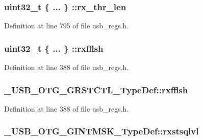 \hypertarget{group___u_s_b___o_t_g___d_r_i_v_e_r_ga14fede4b39b5376cdf45cb097817fbba}{
\subsubsection[{rx\-\_\-thr\-\_\-len}]{\setlength{\rightskip}{0pt plus 5cm}uint32\-\_\-t \{ ... \} \-::rx\-\_\-thr\-\_\-len}}\label{group___u_s_b___o_t_g___d_r_i_v_e_r_ga14fede4b39b5376cdf45cb097817fbba}


Definition at line 795 of file usb\-\_\-regs.\-h.

\hypertarget{group___u_s_b___o_t_g___d_r_i_v_e_r_gac3bc22e3eeec98ccefb2f7fe4a1c7e0c}{
\subsubsection[{rxfflsh}]{\setlength{\rightskip}{0pt plus 5cm}uint32\-\_\-t \{ ... \} \-::rxfflsh}}\label{group___u_s_b___o_t_g___d_r_i_v_e_r_gac3bc22e3eeec98ccefb2f7fe4a1c7e0c}


Definition at line 388 of file usb\-\_\-regs.\-h.

\hypertarget{group___u_s_b___o_t_g___d_r_i_v_e_r_ga1cc327f836fad208772495510703d944}{
\subsubsection[{rxfflsh}]{ \-\_\-\-U\-S\-B\-\_\-\-O\-T\-G\-\_\-\-G\-R\-S\-T\-C\-T\-L\-\_\-\-Type\-Def\-::rxfflsh}}\label{group___u_s_b___o_t_g___d_r_i_v_e_r_ga1cc327f836fad208772495510703d944}


Definition at line 388 of file usb\-\_\-regs.\-h.

\hypertarget{group___u_s_b___o_t_g___d_r_i_v_e_r_ga49f035a272eee9454d65e15275cc76ea}{
\subsubsection[{rxstsqlvl}]{ \-\_\-\-U\-S\-B\-\_\-\-O\-T\-G\-\_\-\-G\-I\-N\-T\-M\-S\-K\-\_\-\-Type\-Def\-::rxstsqlvl}}\label{group___u_s_b___o_t_g___d_r_i_v_e_r_ga49f035a272eee9454d65e15275cc76ea}


